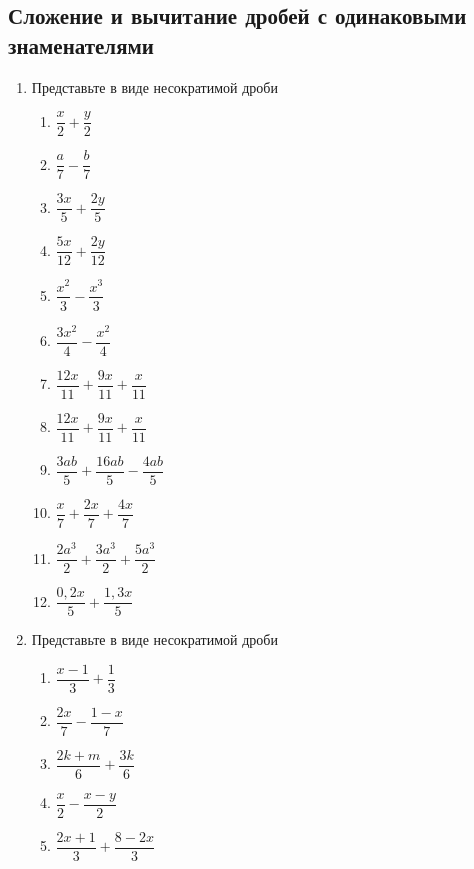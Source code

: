 \documentclass[10pt, a4paper]{article}
\begin{document}
\subsection{Сложение и вычитание дробей с одинаковыми знаменателями}
\begin{enumerate}
	\item Представьте в виде несократимой дроби
	\begin{multicols}{4}
		\begin{enumerate}
			\item $\dfrac{x}{2}+\dfrac{y}{2}$ 
			\item $\dfrac{a}{7}-\dfrac{b}{7}$ 
			\item $\dfrac{3x}{5}+\dfrac{2y}{5}$ 
			\item $\dfrac{5x}{12}+\dfrac{2y}{12}$ 
			\item $\dfrac{x^2}{3}-\dfrac{x^3}{3}$ 
			\item $\dfrac{3x^2}{4}-\dfrac{x^2}{4}$ 
			\item $\dfrac{12x}{11}+\dfrac{9x}{11}+\dfrac{x}{11}$ 
			\item $\dfrac{12x}{11}+\dfrac{9x}{11}+\dfrac{x}{11}$ 
			\item $\dfrac{3ab}{5}+\dfrac{16ab}{5}-\dfrac{4ab}{5}$ 
			\item $\dfrac{x}{7}+\dfrac{2x}{7}+\dfrac{4x}{7}$ 
			\item $\dfrac{2a^3}{2}+\dfrac{3a^3}{2}+\dfrac{5a^3}{2}$ 
			\item $\dfrac{0,2x}{5}+\dfrac{1,3x}{5}$ 
		\end{enumerate}	
	\end{multicols}
	\item Представьте в виде несократимой дроби
	\begin{multicols}{3}
		\begin{enumerate}
			\item $\dfrac{x-1}{3}+\dfrac{1}{3}$ 
			\item $\dfrac{2x}{7}-\dfrac{1-x}{7}$ 
			\item $\dfrac{2k+m}{6}+\dfrac{3k}{6}$ 
			\item $\dfrac{x}{2}-\dfrac{x-y}{2}$ 
			\item $\dfrac{2x+1}{3}+\dfrac{8-2x}{3}$ 

\end{enumerate}
\end{multicols}
\end{enumerate}
\end{document}
